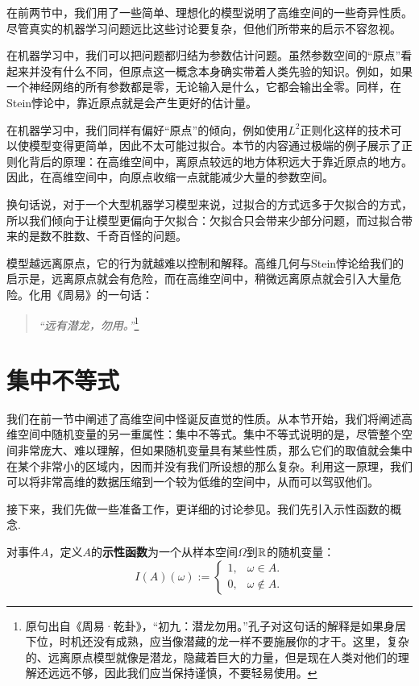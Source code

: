 在前两节中，我们用了一些简单、理想化的模型说明了高维空间的一些奇异性质。尽管真实的机器学习问题远比这些讨论要复杂，但他们所带来的启示不容忽视。

在机器学习中，我们可以把问题都归结为参数估计问题。虽然参数空间的“原点”看起来并没有什么不同，但原点这一概念本身确实带着人类先验的知识。例如，如果一个神经网络的所有参数都是零，无论输入是什么，它都会输出全零。同样，在Stein悖论中，靠近原点就是会产生更好的估计量。

在机器学习中，我们同样有偏好“原点”的倾向，例如使用$L^2$正则化这样的技术可以使模型变得更简单，因此不太可能过拟合。本节的内容通过极端的例子展示了正则化背后的原理：在高维空间中，离原点较远的地方体积远大于靠近原点的地方。因此，在高维空间中，向原点收缩一点就能减少大量的参数空间。

换句话说，对于一个大型机器学习模型来说，过拟合的方式远多于欠拟合的方式，所以我们倾向于让模型更偏向于欠拟合：欠拟合只会带来少部分问题，而过拟合带来的是数不胜数、千奇百怪的问题。

模型越远离原点，它的行为就越难以控制和解释。高维几何与Stein悖论给我们的启示是，远离原点就会有危险，而在高维空间中，稍微远离原点就会引入大量危险。化用《周易》的一句话：
\begin{quotation}
    \emph{“远有潜龙，勿用。”}\footnote{原句出自《周易·乾卦》，“初九：潜龙勿用。”孔子对这句话的解释是如果身居下位，时机还没有成熟，应当像潜藏的龙一样不要施展你的才干。这里，复杂的、远离原点模型就像是潜龙，隐藏着巨大的力量，但是现在人类对他们的理解还远远不够，因此我们应当保持谨慎，不要轻易使用。}
\end{quotation}

\section{集中不等式}

我们在前一节中阐述了高维空间中怪诞反直觉的性质。从本节开始，我们将阐述高维空间中随机变量的另一重属性：集中不等式。集中不等式说明的是，尽管整个空间非常庞大、难以理解，但如果随机变量具有某些性质，那么它们的取值就会集中在某个非常小的区域内，因而并没有我们所设想的那么复杂。利用这一原理，我们可以将非常高维的数据压缩到一个较为低维的空间中，从而可以驾驭他们。

接下来，我们先做一些准备工作，更详细的讨论参见。我们先引入示性函数的概念.
\begin{definition}[示性函数]\label{def:indicator-function}
    对事件$A$，定义$A$的\textbf{示性函数}为一个从样本空间$\Omega$到$\mathbb{R}$的随机变量：
\begin{equation*}
    I(A)(\omega) := 
    \begin{cases}
        1,& \omega \in A. \\
        0,& \omega \notin A.
    \end{cases}
\end{equation*}
\end{definition}


